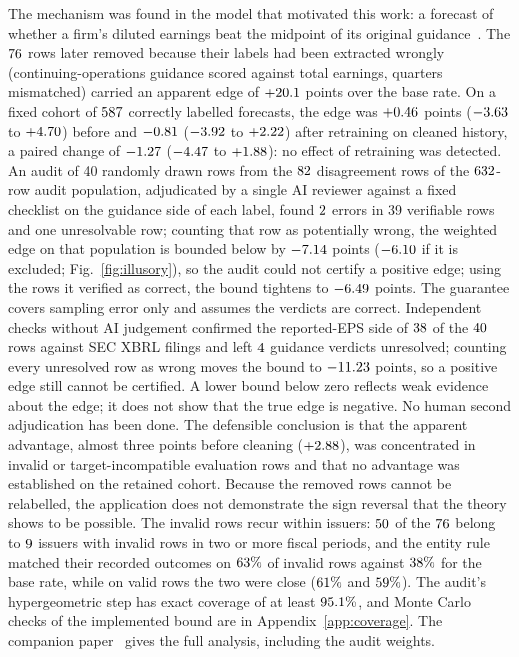 \documentclass[journal]{IEEEtran}
\theoremstyle{definition}
\begin{document}
The mechanism was found in the model that motivated this work: a forecast of whether a firm's diluted earnings beat the midpoint of its original guidance~\cite{ciconte2014midpoint}. The $76$ rows later removed because their labels had been extracted wrongly (continuing-operations guidance scored against total earnings, quarters mismatched) carried an apparent edge of $+20.1$ points over the base rate. On a fixed cohort of $587$ correctly labelled forecasts, the edge was $+0.46$ points ($-3.63$ to $+4.70$) before and $-0.81$ ($-3.92$ to $+2.22$) after retraining on cleaned history, a paired change of $-1.27$ ($-4.47$ to $+1.88$): no effect of retraining was detected. An audit of 40 randomly drawn rows from the $82$ disagreement rows of the $632$-row audit population, adjudicated by a single AI reviewer against a fixed checklist on the guidance side of each label, found $2$ errors in 39 verifiable rows and one unresolvable row; counting that row as potentially wrong, the weighted edge on that population is bounded below by $-7.14$ points ($-6.10$ if it is excluded; Fig.~\ref{fig:illusory}), so the audit could not certify a positive edge; using the rows it verified as correct, the bound tightens to $-6.49$ points. The guarantee covers sampling error only and assumes the verdicts are correct. Independent checks without AI judgement confirmed the reported-EPS side of $38$ of the $40$ rows against SEC XBRL filings and left $4$ guidance verdicts unresolved; counting every unresolved row as wrong moves the bound to $-11.23$ points, so a positive edge still cannot be certified. A lower bound below zero reflects weak evidence about the edge; it does not show that the true edge is negative. No human second adjudication has been done. The defensible conclusion is that the apparent advantage, almost three points before cleaning ($+2.88$), was concentrated in invalid or target-incompatible evaluation rows and that no advantage was established on the retained cohort. Because the removed rows cannot be relabelled, the application does not demonstrate the sign reversal that the theory shows to be possible. The invalid rows recur within issuers: $50$ of the $76$ belong to $9$ issuers with invalid rows in two or more fiscal periods, and the entity rule matched their recorded outcomes on $63\%$ of invalid rows against $38\%$ for the base rate, while on valid rows the two were close ($61\%$ and $59\%$). The audit's hypergeometric step has exact coverage of at least $95.1\%$, and Monte Carlo checks of the implemented bound are in Appendix~\ref{app:coverage}. The companion paper~\cite{abraham2026illusory} gives the full analysis, including the audit weights.
\end{document}
